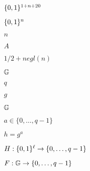 \documentclass[10pt]{book}
\begin{document}
\begin{mdSnippets}
\begin{mdInlineSnippet}[a3b17aeeb37e17e6b060da3ad54a998e]
$\{0,1\}^{1+n+20}$\end{mdInlineSnippet}%
\begin{mdInlineSnippet}%
$\{0,1\}^{n}$\end{mdInlineSnippet}%
\begin{mdInlineSnippet}[7b8b965ad4bca0e41ab51de7b31363a1]%
$n$\end{mdInlineSnippet}%
\begin{mdInlineSnippet}[7fc56270e7a70fa81a5935b72eacbe29]%
$A$\end{mdInlineSnippet}%
\begin{mdInlineSnippet}[e1ca44980c516dbfc280b815f438d540]%
$1/2 + negl(n)$\end{mdInlineSnippet}%
\begin{mdInlineSnippet}[2a0895c1a5aa2537f0578cd815417471]%
$\mathbb{G}$\end{mdInlineSnippet}%
\begin{mdInlineSnippet}[7694f4a66316e53c8cdd9d9954bd611d]%
$q$\end{mdInlineSnippet}%
\begin{mdInlineSnippet}[b2f5ff47436671b6e533d8dc3614845d]%
$g$\end{mdInlineSnippet}%
\begin{mdInlineSnippet}[2a0895c1a5aa2537f0578cd815417471]%
$\mathbb{G}$\end{mdInlineSnippet}%
\begin{mdInlineSnippet}[2a0ecbb566eb2a4301f70de9bb2317a3]%
$a\in \{0,\ldots,q-1\}$\end{mdInlineSnippet}%
\begin{mdInlineSnippet}[db8b3bf1a9c14e73f9e6ff0ebdbf00f5]%
$h=g^a$\end{mdInlineSnippet}%
\begin{mdInlineSnippet}[5a618821dccdf2c8a94086b4c8974c8e]%
$H:\{0,1\}^\ell \rightarrow \{0,\ldots,q-1\}$\end{mdInlineSnippet}%
\begin{mdInlineSnippet}[1f7eb0d9e688c9baec9a600f8ee284a7]%
$F:\mathbb{G}\rightarrow\{0,\ldots,q-1\}$\end{mdInlineSnippet}%
\begin{mdInlineSnippet}[90e8f35ea87a853a71f3ddbe82f8105f]%

\end{mdInlineSnippet}
\end{mdSnippets}
\end{document}
